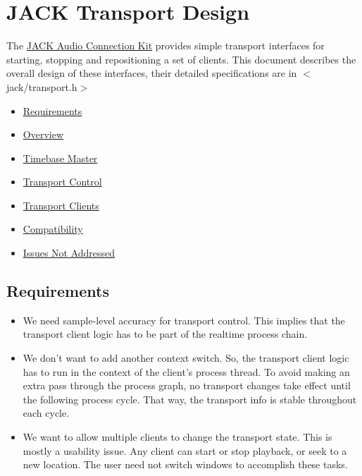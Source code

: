 \hypertarget{transport-design}{}\section{JACK Transport Design}\label{transport-design}
The \hyperlink{index_index}{JACK Audio Connection Kit} provides simple transport interfaces for starting, stopping and repositioning a set of clients. This document describes the overall design of these interfaces, their detailed specifications are in $<$jack/transport.h$>$

\begin{itemize}
\item \hyperlink{transport-design_requirements}{Requirements}\item \hyperlink{transport-design_overview}{Overview}\item \hyperlink{transport-design_timebase}{Timebase Master}\item \hyperlink{transport-design_transportcontrol}{Transport Control}\item \hyperlink{transport-design_transportclients}{Transport Clients}\item \hyperlink{transport-design_compatibility}{Compatibility}\item \hyperlink{transport-design_issues}{Issues Not Addressed}\end{itemize}
\hypertarget{transport-design_requirements}{}\subsection{Requirements}\label{transport-design_requirements}
\begin{itemize}
\item We need sample-level accuracy for transport control. This implies that the transport client logic has to be part of the realtime process chain.\end{itemize}


\begin{itemize}
\item We don't want to add another context switch. So, the transport client logic has to run in the context of the client's process thread. To avoid making an extra pass through the process graph, no transport changes take effect until the following process cycle. That way, the transport info is stable throughout each cycle.\end{itemize}


\begin{itemize}
\item We want to allow multiple clients to change the transport state. This is mostly a usability issue. Any client can start or stop playback, or seek to a new location. The user need not switch windows to accomplish these tasks.\end{itemize}


